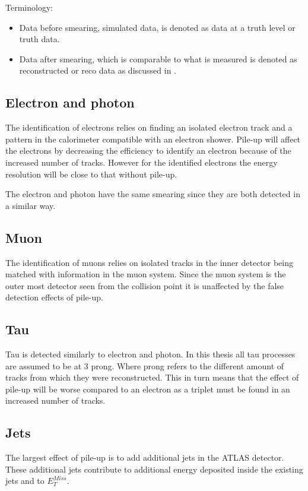 Terminology:
\begin{itemize}
\item Data before smearing, simulated data, is denoted as data at a truth level or truth data.
\item Data after smearing, which is comparable to what is measured is denoted as reconstructed or reco data as discussed in .
\end{itemize}

\subsection{Electron and photon}
The identification of electrons relies on finding an isolated electron track and a pattern in the calorimeter compatible with an electron shower. Pile-up will affect the electrons by decreasing the efficiency to identify an electron because of the increased number of tracks. However for the identified electrons the energy resolution will be close to that without pile-up.

The electron and photon have the same smearing since they are both detected in a similar way. 

\subsection{Muon}
The identification of muons relies on isolated tracks in the inner detector  being matched with information in the muon system. Since the muon system is the outer most detector seen from the collision point it is unaffected by the false detection effects of pile-up.  
\subsection{Tau}
Tau is detected similarly to electron and photon.
In this thesis all tau processes are assumed to be at 3 prong. Where prong refers to the different amount of tracks from which they were reconstructed. This in turn means that the effect of pile-up will be worse compared to an electron as a triplet must be found in an increased number of tracks.
\subsection{Jets}
The largest effect of pile-up is to add additional jets in the ATLAS detector. These additional jets contribute to additional energy deposited inside the existing jets and to $E^{Miss}_T$.

